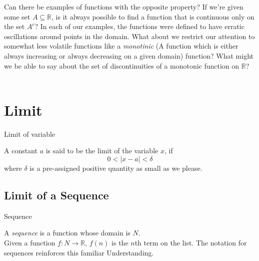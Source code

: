 \documentclass[12pt]{article}
\begin{document}
\quad Can there be examples of functions with the opposite property? If we're given some set $A \subseteq \mathbb{R}$, is it always possible to find a function that is continuous only on the set $A^c$? In each of our examples, the functions were defined to have erratic oscillations around points in the domain. What about we restrict our attention to somewhat less volatile functions like a \textit{monotinic} (A function which is either always increasing or always decreasing on a given domain) function? What might we be able to say about the set of discontinuities of a monotonic function on $\mathbb{R}$? \\~\\



\section{Limit}

\begin{center}
\end{center}

\begin{definition*}{Limit of variable}

    A constant $a$ is said to be the limit of the variable $x$, if \[
        0 < |x-a| < \delta
    \] where $\delta$ is a pre-assigned positive quantity as small as we please.
\end{definition*}



\subsection{Limit of a Sequence}

\begin{definition}{Sequence}

    A \textit{sequence} is a function whose domain is $N$.\\
    Given a function $f:N \to \mathbb{R}$, $f(n)$ is the $n$th term on the list. The notation for sequences reinforces this familiar Understanding.
\end{definition}
\end{document}
